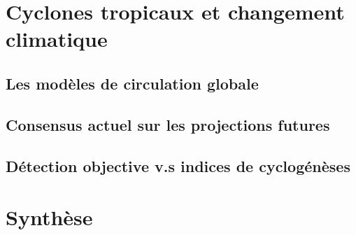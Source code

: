 \documentclass[../main.tex]{subfiles}
\begin{document}
\section{Cyclones tropicaux et changement climatique}

\subsection{Les modèles de circulation globale}

\subsection{Consensus actuel sur les projections futures}

\subsection{Détection objective v.s indices de cyclogénèses}

\section{Synthèse}
\end{document}
